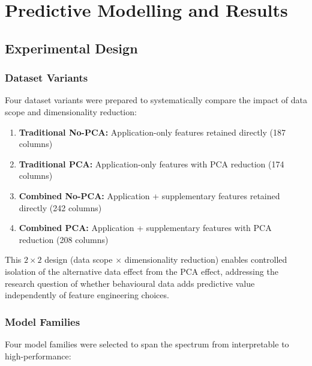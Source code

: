 \chapter{Predictive Modelling and Results}
\label{chap:modeling}

\section{Experimental Design}
\label{sec:experimental_design}

\subsection{Dataset Variants}

Four dataset variants were prepared to systematically compare the impact of data scope and dimensionality reduction:

\begin{enumerate}
    \item \textbf{Traditional No-PCA:} Application-only features retained directly (187 columns)
    \item \textbf{Traditional PCA:} Application-only features with PCA reduction (174 columns)
    \item \textbf{Combined No-PCA:} Application + supplementary features retained directly (242 columns)
    \item \textbf{Combined PCA:} Application + supplementary features with PCA reduction (208 columns)
\end{enumerate}

This $2 \times 2$ design (data scope $\times$ dimensionality reduction) enables controlled isolation of the alternative data effect from the PCA effect, addressing the research question of whether behavioural data adds predictive value independently of feature engineering choices.

\subsection{Model Families}

Four model families were selected to span the spectrum from interpretable to high-performance:


